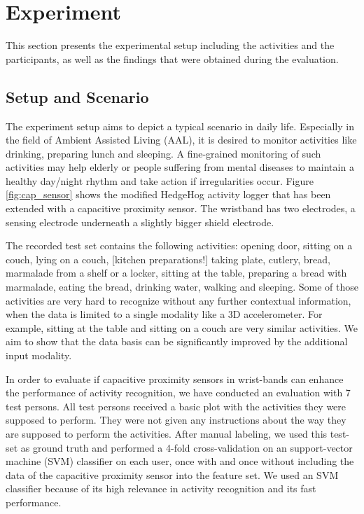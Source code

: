 \documentclass[runningheads,a4paper]{llncs}
\begin{document}
\section{Experiment}
\label{sect:experiment}

This section presents the experimental setup including the activities and the participants, as well as the findings that were obtained during the evaluation.

\subsection{Setup and Scenario}

The experiment setup aims to depict a typical scenario in daily life. Especially in the field of Ambient Assisted Living (AAL), it is desired to monitor activities like drinking, preparing lunch and sleeping. A fine-grained monitoring of such activities may help elderly or people suffering from mental diseases to maintain a healthy day/night rhythm and take action if irregularities occur. Figure \ref{fig:cap_sensor} shows the modified HedgeHog activity logger that has been extended with a capacitive proximity sensor. The wristband has two electrodes, a sensing electrode underneath a slightly bigger shield electrode. 

The recorded test set contains the following activities: opening door, sitting on a couch, lying on a couch, [kitchen preparations!] taking plate, cutlery, bread, marmalade from a shelf or a locker, sitting at the table, preparing a bread with marmalade, eating the bread, drinking water, walking and sleeping. Some of those activities are very hard to recognize without any further contextual information, when the data is limited to a single modality like a 3D accelerometer. For example, sitting at the table and sitting on a couch are very similar activities. We aim to show that the data basis can be significantly improved by the additional input modality. 

In order to evaluate if capacitive proximity sensors in wrist-bands can enhance the performance of activity recognition, we have conducted an evaluation with 7 test persons. All test persons received a basic plot with the activities they were supposed to perform. They were not given any instructions about the way they are supposed to perform the activities. After manual labeling, we used this test-set as ground truth and performed a 4-fold cross-validation on an support-vector machine (SVM) classifier on each user, once with and once without including the data of the capacitive proximity sensor into the feature set. We used an SVM classifier because of its high relevance in activity recognition and its fast performance. 
\end{document}
